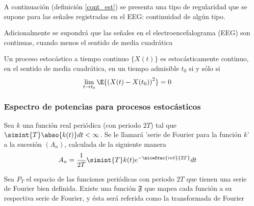 A continuaci\'on (definici\'on \ref{cont_est}) se presenta una tipo de regularidad que se supone
para las se\~nales registradas en el EEG: continuidad de alg\'un tipo.

Adicionalmente se supondrá que las señales en el electroencefalograma (EEG) son continuas, cuando menos
el sentido de media cuadrática

\begin{defn}
Un proceso estoc\'astico a tiempo continuo $\{ X(t) \}$ es estoc\'asticamente continuo, en el 
sentido de media cuadr\'atica, en un tiempo admisible $t_0$ si y s\'olo si
\begin{equation*}
\lim_{t \rightarrow t_0} \E{\left( X(t) - X(t_0) \right)^{2}} = 0
\end{equation*}
\label{cont_est}
\end{defn}


\subsubsection{Espectro de potencias para procesos estoc\'asticos}

\begin{defn}
Sea $k$ una funci\'on real peri\'odica (con periodo $2T$) tal que 
$\simint{T} \abso{k(t)} dt < \infty$. 
Se le llamar\'a 'serie de Fourier para la funci\'on $k$' a la sucesi\'on $\left( A_n \right)$, 
calculada de la siguiente manera
\begin{equation*}
A_n = \frac{1}{2 T} \simint{T} k(t) e^{-\nicefrac{ i n t}{2T}} dt
\end{equation*}
\label{FourierClasico}
\end{defn}

\begin{defn}
Sea $P_T$ el espacio de las funciones peri\'odicas con periodo $2T$ que tienen una serie de Fourier 
bien definida. Existe una funci\'on $\mathfrak{F}$ que mapea cada funci\'on a su respectiva serie 
de Fourier, y \'esta ser\'a referida como la transformada de Fourier
\label{trFourier}
\end{defn}

